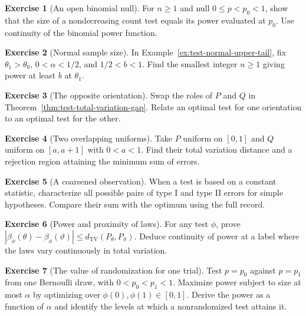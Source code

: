 \documentclass[11pt,oneside]{book}
\theoremstyle{definition}
\newtheorem{exercise}{Exercise}[section]
\theoremstyle{remark}
\begin{document}
\begin{exercise}[An open binomial null]
\label{exer:test-open-binomial-boundary}
For $n\geq1$ and null $0\leq p<p_0<1$, show that the size of
a nondecreasing count test equals its power evaluated at $p_0$.
Use continuity of the binomial power function.
\end{exercise}

\begin{exercise}[Normal sample size]
\label{exer:test-normal-power-sample-size}
In Example~\ref{ex:test-normal-upper-tail}, fix $\theta_1>\theta_0$,
$0<\alpha<1/2$, and $1/2<b<1$. Find the smallest integer $n\geq1$
giving power at least $b$ at $\theta_1$.
\end{exercise}

\begin{exercise}[The opposite orientation]
\label{exer:test-total-variation-symmetry}
Swap the roles of $P$ and $Q$ in Theorem~\ref{thm:test-total-variation-gap}.
Relate an optimal test for one orientation to an optimal test for
the other.
\end{exercise}

\begin{exercise}[Two overlapping uniforms]
\label{exer:test-overlapping-uniforms}
Take $P$ uniform on $[0,1]$ and $Q$ uniform on $[a,a+1]$ with
$0<a<1$. Find their total variation distance and a rejection
region attaining the minimum sum of errors.
\end{exercise}

\begin{exercise}[A coarsened observation]
\label{exer:test-tv-constant-statistic}
When a test is based on a constant statistic, characterize all
possible pairs of type I and type II errors for simple hypotheses.
Compare their sum with the optimum using the full record.
\end{exercise}

\begin{exercise}[Power and proximity of laws]
\label{exer:test-power-lipschitz}
For any test $\phi$, prove
$|\beta_\phi(\theta)-\beta_\phi(\vartheta)|\leq d_{\mathrm{TV}}(P_\theta,P_\vartheta)$.
Deduce continuity of power at a label where the laws vary
continuously in total variation.
\end{exercise}

\begin{exercise}[The value of randomization for one trial]
\label{exer:test-one-bernoulli-optimal-power}
Test $p=p_0$ against $p=p_1$ from one Bernoulli draw, with
$0<p_0<p_1<1$. Maximize power subject to size at most $\alpha$
by optimizing over $\phi(0),\phi(1)\in[0,1]$. Derive the
power as a function of $\alpha$ and identify the levels at
which a nonrandomized test attains it.
\end{exercise}
\end{document}
